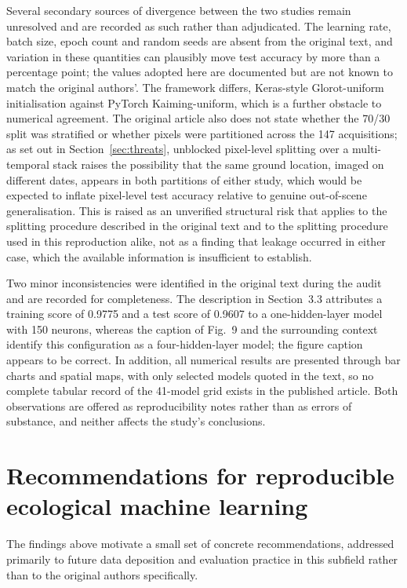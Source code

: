 \documentclass[10pt,twocolumn,a4paper]{article}
\begin{document}
Several secondary sources of divergence between the two studies remain unresolved and are recorded
as such rather than adjudicated. The learning rate, batch size, epoch count and random seeds are
absent from the original text, and variation in these quantities can plausibly move test accuracy
by more than a percentage point; the values adopted here are documented but are not known to match
the original authors'. The framework differs, Keras-style Glorot-uniform initialisation against
PyTorch Kaiming-uniform, which is a further obstacle to numerical agreement. The original article
also does not state whether the 70/30 split was stratified or whether pixels were partitioned across
the 147 acquisitions; as set out in Section~\ref{sec:threats}, unblocked pixel-level splitting over
a multi-temporal stack raises the possibility that the same ground location, imaged on different
dates, appears in both partitions of either study, which would be expected to inflate pixel-level
test accuracy relative to genuine out-of-scene generalisation. This is raised as an unverified
structural risk that applies to the splitting procedure described in the original text and to the
splitting procedure used in this reproduction alike, not as a finding that leakage occurred in
either case, which the available information is insufficient to establish.

Two minor inconsistencies were identified in the original text during the audit and are recorded
for completeness. The description in Section~3.3 attributes a training score of 0.9775 and a test
score of 0.9607 to a one-hidden-layer model with 150 neurons, whereas the caption of Fig.~9 and the
surrounding context identify this configuration as a four-hidden-layer model; the figure caption
appears to be correct. In addition, all numerical results are presented through bar charts and
spatial maps, with only selected models quoted in the text, so no complete tabular record of the
41-model grid exists in the published article. Both observations are offered as reproducibility
notes rather than as errors of substance, and neither affects the study's conclusions.

\section{Recommendations for reproducible ecological machine learning}
\label{sec:recommendations}

The findings above motivate a small set of concrete recommendations, addressed primarily to future
data deposition and evaluation practice in this subfield rather than to the original authors
specifically.
\end{document}

